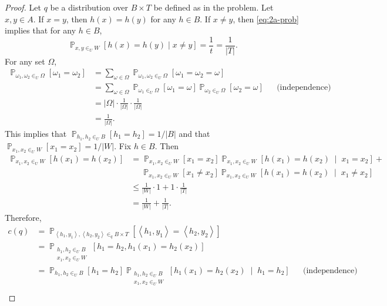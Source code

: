 \documentclass[letterpaper, reqno,11pt]{article}
\newcommand{\PP}{\mathop{{}\mathbb{P}}}
\begin{document}
\begin{enumerate}
\begin{enumerate}
    \begin{proof}
      Let $q$ be a distribution over $B \times T$ be defined as in the problem. Let $x, y \in A$. If $x = y$, then $h(x) = h(y)$ for any $h \in B$. If $x \neq y$, then \eqref{eq:2a-prob} implies that for any $h \in B$,
      $$ \PP_{x, y \in_U W}[h(x) = h(y) \mid x \neq y] = \frac{1}{t} = \frac{1}{|T|}. $$
      For any set $\Omega$,
      \begin{align*}
        \PP_{\omega_1, \omega_2 \in_U \Omega}\left[\omega_1 = \omega_2\right] &= \sum_{\omega \in \Omega} \PP_{\omega_1, \omega_2 \in_U \Omega}\left[\omega_1 = \omega_2 = \omega\right] \\
        &= \sum_{\omega \in \Omega} \PP_{\omega_1 \in_U \Omega}\left[\omega_1 = \omega\right] \PP_{\omega_2 \in_U \Omega}\left[\omega_2 = \omega\right] && \text{(independence)} \\
        &= |\Omega| \cdot \frac{1}{|\Omega|} \cdot \frac{1}{|\Omega|} \\
        &= \frac{1}{|\Omega|}.
      \end{align*}
      This implies that $\PP_{h_1, h_2 \in_U B}[h_1 = h_2] = 1/|B|$ and that $\PP_{x_1, x_2 \in_U W}[x_1 = x_2] = 1/|W|$. Fix $h \in B$. Then
      \begin{align*}
        \PP_{x_1, x_2 \in_U W}\left[h\left(x_1\right) = h\left(x_2\right)\right] &= \PP_{x_1, x_2 \in_U W}\left[x_1 = x_2\right] \PP_{x_1, x_2 \in_U W}\left[h\left(x_1\right) = h\left(x_2\right) \;\middle|\; x_1 = x_2\right] + \\
        &\quad\; \PP_{x_1, x_2 \in_U W}\left[x_1 \neq x_2\right] \PP_{x_1, x_2 \in_U W}\left[h\left(x_1\right) = h\left(x_2\right) \;\middle|\; x_1 \neq x_2\right] \\
        &\leq \frac{1}{|W|} \cdot 1 + 1 \cdot \frac{1}{|T|} \\
        &= \frac{1}{|W|} + \frac{1}{|T|}.
      \end{align*}
      Therefore,
      \begin{align*}
        c(q) &= \PP_{\left\langle h_1, y_1 \right\rangle, \left\langle h_2, y_2 \right\rangle \in_q B \times T}\left[\left\langle h_1, y_1 \right\rangle = \left\langle h_2, y_2 \right\rangle\right] \\
        &= \PP_{\substack{h_1, h_2 \in_U B \\ x_1, x_2 \in_U W}}\left[h_1 = h_2, h_1\left(x_1\right) = h_2\left(x_2\right)\right] \\
        &= \PP_{h_1, h_2 \in_U B}\left[h_1 = h_2\right] \PP_{\substack{h_1, h_2 \in_U B \\ x_1, x_2 \in_U W}} \left[h_1\left(x_1\right) = h_2\left(x_2\right) \;\middle|\; h_1 = h_2\right] && \text{(independence)} \\

\end{align*}
\end{proof}
\end{enumerate}
\end{enumerate}
\end{document}

